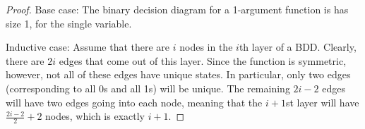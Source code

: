 \documentclass{amsart}
\begin{document}
\begin{enumerate}
\begin{proof}
  Base case: The binary decision diagram for a 1-argument function is has size
  1, for the single variable.

  Inductive case:  Assume that there are $i$ nodes in the $i$th layer of a BDD.
  Clearly, there are $2i$ edges that come out of this layer.
  Since the function is symmetric, however, not all of these edges have unique
  states.  In particular, only two edges (corresponding to all 0s and all 1s)
  will be unique.  The remaining $2i - 2$ edges will have two edges going into
  each node, meaning that the $i+1$st layer will have $\frac{2i -2}{2} + 2$
  nodes, which is exactly $i+1$.
\end{proof}
\end{enumerate}



\end{document}
